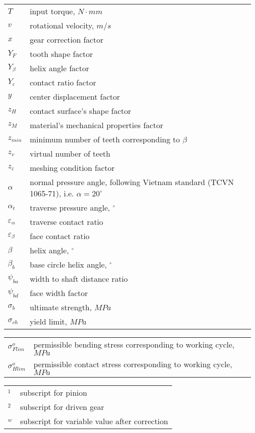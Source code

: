 \begin{tabular}[t]{lp{6.5cm}}
	

	$ T $ & input torque, $ \unit{N\cdot mm} $\\
	$ v $ & rotational velocity, $ \unit{m/s} $\\
	$ x $ & gear correction factor\\
	$ Y_F $ & tooth shape factor\\
	$ Y_\beta $ & helix angle factor\\
	$ Y_\varepsilon $ & contact ratio factor\\
	$ y $ & center displacement factor\\
	$ z_H $ & contact surface's shape factor\\
	$ z_M $ & material's mechanical properties factor \\
	$ z_{min} $ & minimum number of teeth corresponding to $ \beta $\\
	$ z_v $ & virtual number of teeth\\
	$ z_\varepsilon $ & meshing condition factor\\
	$ \alpha $ & normal pressure angle, following Vietnam standard (TCVN 1065-71), i.e. $ \alpha = 20^\circ $\\
	$ \alpha_t $ & traverse pressure angle, $ ^\circ $\\
	$ \varepsilon_\alpha $ & traverse contact ratio\\
	$ \varepsilon_\beta $ & face contact ratio\\
	$ \beta $ & helix angle, $ ^\circ $\\
	$ \beta_b $ & base circle helix angle, $ ^\circ $\\
	$ \psi_{ba} $ & width to shaft distance ratio\\
	$ \psi_{bd} $ & face width factor \\
	$ \sigma_b $ & ultimate strength, $ \unit{MPa} $\\
	$ \sigma_{ch} $ & yield limit, $ \unit{MPa} $\\
	
\end{tabular}\newpage
\begin{tabular}[t]{lp{6.5cm}}
	$ \sigma_{Flim}^o $ & permissible bending stress corresponding to working cycle, $ \unit{MPa} $\\
	$ \sigma_{Hlim}^o $ & permissible contact stress corresponding to working cycle, $ \unit{MPa} $\\
\end{tabular}
\begin{tabular}[t]{lp{6.5cm}}
	
	$ _1 $ & subscript for pinion\\
	$ _2 $ & subscript for driven gear\\
	$ _w $ & subscript for variable value after correction\\
\end{tabular}

